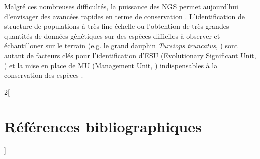 \documentclass[a4paper,12pt,twoside]{article}\usepackage[]{graphicx}\usepackage[]{color}
\begin{document}
\begin {bibunit} [newbst]
Malgré ces nombreuses difficultés, la puissance des NGS permet aujourd'hui d'envisager des avancées rapides en terme de conservation \citep{shafer2015genomics}. L'identification de structure de populations à très fine échelle \citep{o2015rare} ou l'obtention de très grandes quantités de données génétiques sur des espèces difficiles à observer et échantilloner sur le terrain (e.g. le grand dauphin \emph{Tursiops truncatus}, \citealp{schipper2008status}) sont autant de facteurs clés pour l'identification d'ESU (Evolutionary Significant Unit, \citealp{ryder1986species}) et la mise en place de MU (Management Unit, \citealp{hawkins2016fisheries}) indispensables à la conservation des espèces \citep{casiraghi2016}.


\begin{otherlanguage}{english}
		\singlespacing
		\small
		\begin{multicols}{2}[\section{Références bibliographiques}]
		\def\section*#1{}
		\putbib [BibliographieEA]
	\end{multicols}
\end{otherlanguage}

\end {bibunit}

\newpage
\end{document}
